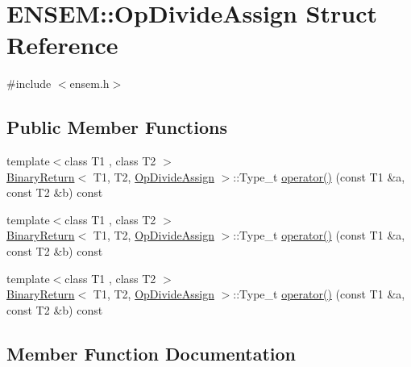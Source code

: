 \hypertarget{structENSEM_1_1OpDivideAssign}{}\section{E\+N\+S\+EM\+:\+:Op\+Divide\+Assign Struct Reference}
\label{structENSEM_1_1OpDivideAssign}


{\ttfamily \#include $<$ensem.\+h$>$}

\subsection*{Public Member Functions}
\begin{DoxyCompactItemize}
\item 
{\footnotesize template$<$class T1 , class T2 $>$ }\\\mbox{\hyperlink{structENSEM_1_1BinaryReturn}{Binary\+Return}}$<$ T1, T2, \mbox{\hyperlink{structENSEM_1_1OpDivideAssign}{Op\+Divide\+Assign}} $>$\+::Type\+\_\+t \mbox{\hyperlink{structENSEM_1_1OpDivideAssign_a16a1ece4c032ceb92428ac26535c4ae9}{operator()}} (const T1 \&a, const T2 \&b) const
\item 
{\footnotesize template$<$class T1 , class T2 $>$ }\\\mbox{\hyperlink{structENSEM_1_1BinaryReturn}{Binary\+Return}}$<$ T1, T2, \mbox{\hyperlink{structENSEM_1_1OpDivideAssign}{Op\+Divide\+Assign}} $>$\+::Type\+\_\+t \mbox{\hyperlink{structENSEM_1_1OpDivideAssign_a16a1ece4c032ceb92428ac26535c4ae9}{operator()}} (const T1 \&a, const T2 \&b) const
\item 
{\footnotesize template$<$class T1 , class T2 $>$ }\\\mbox{\hyperlink{structENSEM_1_1BinaryReturn}{Binary\+Return}}$<$ T1, T2, \mbox{\hyperlink{structENSEM_1_1OpDivideAssign}{Op\+Divide\+Assign}} $>$\+::Type\+\_\+t \mbox{\hyperlink{structENSEM_1_1OpDivideAssign_a16a1ece4c032ceb92428ac26535c4ae9}{operator()}} (const T1 \&a, const T2 \&b) const
\end{DoxyCompactItemize}


\subsection{Member Function Documentation}
\mbox{\label{structENSEM_1_1OpDivideAssign_a16a1ece4c032ceb92428ac26535c4ae9}} 
